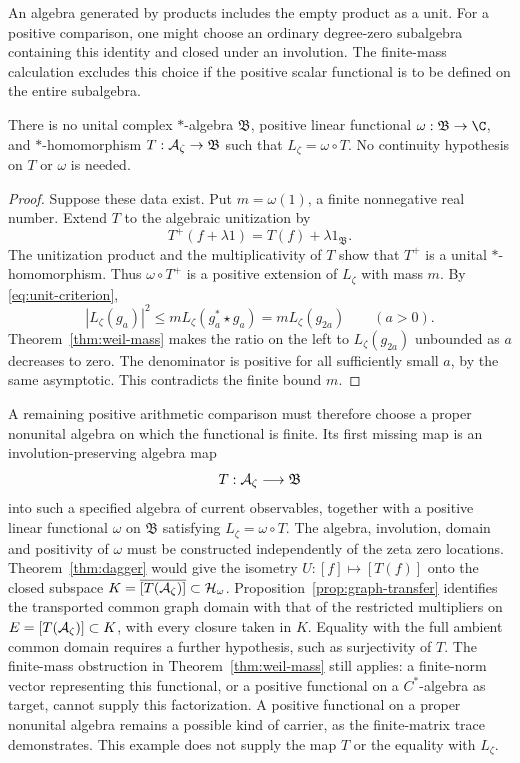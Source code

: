 An algebra generated by products includes the empty product as a unit.
For a positive comparison, one might choose an ordinary degree-zero
subalgebra containing this identity and closed under an involution.
The finite-mass calculation excludes this choice if the positive scalar
functional is to be defined on the entire subalgebra.

\begin{proposition}
\label{prop:weil-unital-current}
There is no unital complex $*$-algebra $\mathfrak B$, positive linear
functional $\omega:\mathfrak B\to\C$, and $*$-homomorphism
$T:\mathcal A_\zeta\to\mathfrak B$ such that $L_\zeta=\omega\circ T$.
No continuity hypothesis on $T$ or $\omega$ is needed.
\end{proposition}
\begin{proof}
Suppose these data exist.  Put $m=\omega(1)$, a finite nonnegative real
number.  Extend $T$ to the algebraic unitization by
\[
 T^+(f+\lambda1)=T(f)+\lambda1_{\mathfrak B}.
\]
The unitization product and the multiplicativity of $T$ show that $T^+$
is a unital $*$-homomorphism.
Thus $\omega\circ T^+$ is a positive extension of $L_\zeta$ with mass $m$.
By \eqref{eq:unit-criterion},
\[
 |L_\zeta(g_a)|^2\leq m L_\zeta(g_a^*\star g_a)
                  =m L_\zeta(g_{2a})\qquad(a>0).
\]
Theorem~\ref{thm:weil-mass} makes the ratio on the left to
$L_\zeta(g_{2a})$ unbounded as $a$ decreases to zero.
The denominator is positive for all sufficiently small $a$, by the same
asymptotic.  This contradicts the finite bound $m$.
\end{proof}

A remaining positive arithmetic comparison must therefore choose a
proper nonunital algebra on which the functional is finite.
Its first missing map is an involution-preserving algebra map
\[
 T:\mathcal A_\zeta\longrightarrow\mathfrak B
\]
into such a specified algebra of current observables, together with a positive
linear functional $\omega$ on $\mathfrak B$ satisfying
$L_\zeta=\omega\circ T$.
The algebra, involution, domain and positivity of $\omega$ must be
constructed independently of the zeta zero locations.
Theorem~\ref{thm:dagger} would give the isometry
$U:[f]\mapsto[T(f)]$ onto the closed subspace
$K=\overline{[T(\mathcal A_\zeta)]}\subset\mathcal H_\omega$.
Proposition~\ref{prop:graph-transfer} identifies the transported common
graph domain with that of the restricted multipliers on
$E=[T(\mathcal A_\zeta)]\subset K$, with every closure taken in $K$.
Equality with the full ambient common domain requires a further
hypothesis, such as surjectivity of $T$.
The finite-mass obstruction in Theorem~\ref{thm:weil-mass} still applies:
a finite-norm vector representing this functional, or a positive
functional on a $C^*$-algebra as target, cannot supply this factorization.
A positive functional on a proper nonunital algebra remains a possible
kind of carrier, as the finite-matrix trace demonstrates.  This example
does not supply the map $T$ or the equality with $L_\zeta$.

